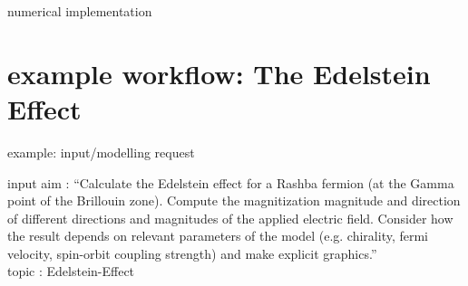 \documentclass[t,
10pt,
]{beamer}
\numberwithin{equation}{section}
\begin{document}
\begin{frame}[c]{numerical implementation}
{\begin{figure}
 		\end{figure}
 		}
 	\end{frame}
	
	\section{example workflow: The Edelstein Effect}

	\begin{frame}[c]{example: input/modelling request}
		\begin{exampleblock}{input}
			\Large aim : \enquote{Calculate the Edelstein effect for a Rashba fermion (at the Gamma point of the Brillouin zone). \newline Compute the magnitization magnitude and direction of different directions and magnitudes of the applied electric field. \newline Consider how the result depends on relevant parameters of the model (e.g. chirality, fermi velocity, spin-orbit coupling strength) and make explicit graphics.}\\
			\bigskip
			topic : Edelstein-Effect\\
		\end{exampleblock}
	\end{frame}
	
\end{document}

